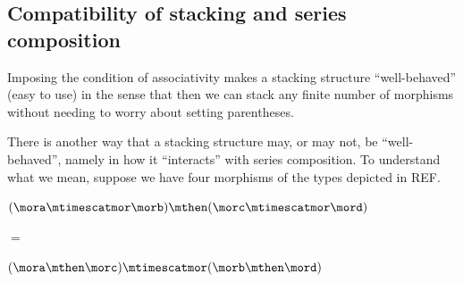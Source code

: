\begin{example}
\end{example}

\subsection{Compatibility of stacking and series composition}

Imposing the condition of associativity makes a stacking structure ``well-behaved'' (easy to use) in the sense that then we can stack any finite number of morphisms without needing to worry about setting parentheses. 

There is another way that a stacking structure may, or may not, be ``well-behaved'', namely in how it ``interacts'' with series composition. To understand what we mean, suppose we have four morphisms of the types depicted in REF.


\begin{marginfigure}
    \centering
    $(\mora \mtimescatmor \morb )
        \mthen (\morc \mtimescatmor \mord )$

    \vspace{3mm}

    $=$

    \vspace{3mm}
    \vspace{3mm}
    $(\mora \mthen \morc ) \mtimescatmor (\morb \mthen \mord )$

    \caption{Commutation of stacking and composition in a functorial stacking . }
    \label{fig:stacking-functorial}
\end{marginfigure}



